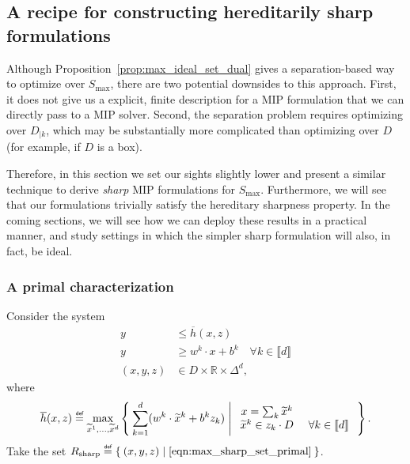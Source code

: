\documentclass[smallextended]{svjour3}
\newcommand\defeq{\mathrel{\overset{\makebox[0pt]{\mbox{\normalfont\tiny\sffamily def}}}{=}}}
\newcommand{\TODO}[1]{\textbf{\color{red} TODO: }{\emph{#1}}}
\newcommand{\tx}{\widetilde{x}}
\newcommand{\Rsharp}{R_{\operatorname{sharp}}}
\newcommand{\Smax}{S_{\operatorname{max}}}
\renewcommand{\bar}[1]{\overline{#1}}
\begin{document}

\subsection{A recipe for constructing hereditarily sharp formulations}

Although Proposition~\ref{prop:max_ideal_set_dual} gives a separation-based way to optimize over $\Smax$, there are two potential downsides to this approach. First, it does not give us a explicit, finite description for a MIP formulation that we can directly pass to a MIP solver. Second, the separation problem requires optimizing over $D_{|k}$, which may be substantially more complicated than optimizing over $D$ (for example, if $D$ is a box).

Therefore, in this section we set our sights slightly lower and present a similar technique to derive \emph{sharp} MIP formulations for $\Smax$. Furthermore, we will see that our formulations trivially satisfy the hereditary sharpness property. In the coming sections, we will see how we can deploy these results in a practical manner, and study settings in which the simpler sharp formulation will also, in fact, be ideal.

\subsubsection{A primal characterization}

Consider the system
\begin{subequations}\label{eqn:max_sharp_set_primal}
\begin{align}
    y &\leq \bar{h}(x, z)\label{eqn:max_sharp_set_primal-1}\\
    y &\geq w^k \cdot x + b^k\quad\forall k \in \llbracket d \rrbracket \label{eqn:max_sharp_set_primal-2}\\
    (x,y,z) &\in D \times \mathbb{R} \times \Delta^d,
\end{align}
\end{subequations}
where
\begin{align*}
    \bar{h}(x, z) \defeq \max_{\tx^1, \ldots, \tx^d}\Set{\sum_{k=1}^d (w^k \cdot \tx^k + b^k z_k) | \begin{array}{cc} x = \sum_k \tx^k & \\ \tx^k \in z_k \cdot D &\ \forall k \in \llbracket d \rrbracket \end{array}}.
\end{align*}
Take the set $\Rsharp \defeq \Set{ (x,y,z) | \eqref{eqn:max_sharp_set_primal} }$.
\end{document}
